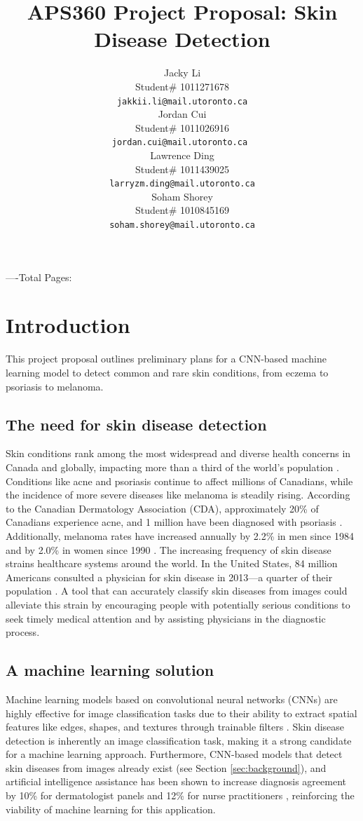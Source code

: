 \documentclass{article} %
\title{APS360 Project Proposal: Skin Disease Detection}
\author{Jacky Li  \\
Student\# 1011271678\\
\texttt{jakkii.li@mail.utoronto.ca} \\
\And
Jordan Cui  \\
Student\# 1011026916 \\
\texttt{jordan.cui@mail.utoronto.ca \phantom{    }} \\
\AND
Lawrence Ding  \\
Student\# 1011439025 \\
\texttt{larryzm.ding@mail.utoronto.ca} \\
\And
Soham Shorey \\
Student\# 1010845169 \\
\texttt{soham.shorey@mail.utoronto.ca} \\
\AND
}
\begin{document}
\maketitle
\vspace{-1.5cm}
----Total Pages: \pageref{last_page}

\section{Introduction}

This project proposal outlines preliminary plans for a CNN-based machine learning model to detect common and rare skin conditions, from eczema to psoriasis to melanoma.

\subsection{The need for skin disease detection}

Skin conditions rank among the most widespread and diverse health concerns in Canada and globally, impacting more than a third of the world's population \citep{li2024large}. Conditions like acne and psoriasis continue to affect millions of Canadians, while the incidence of more severe diseases like melanoma is steadily rising. According to the Canadian Dermatology Association (CDA), approximately 20\% of Canadians experience acne, and 1 million have been diagnosed with psoriasis \citep{cda2025skin}. Additionally, melanoma rates have increased annually by 2.2\% in men since 1984 and by 2.0\% in women since 1990 \citep{cda2025melanoma}. The increasing frequency of skin disease strains healthcare systems around the world. In the United States, 84 million Americans consulted a physician for skin disease in 2013—a quarter of their population \citep{aad2025burden}. A tool that can accurately classify skin diseases from images could alleviate this strain by encouraging people with potentially serious conditions to seek timely medical attention and by assisting physicians in the diagnostic process.

\subsection{A machine learning solution}

Machine learning models based on convolutional neural networks (CNNs) are highly effective for image classification tasks due to their ability to extract spatial features like edges, shapes, and textures through trainable filters \citep{huang2023image}. Skin disease detection is inherently an image classification task, making it a strong candidate for a machine learning approach. Furthermore, CNN-based models that detect skin diseases from images already exist (see Section \ref{sec:background}), and artificial intelligence assistance has been shown to increase diagnosis agreement by 10\% for dermatologist panels and 12\% for nurse practitioners \citep{liu2021development}, reinforcing the viability of machine learning for this application.
\end{document}
